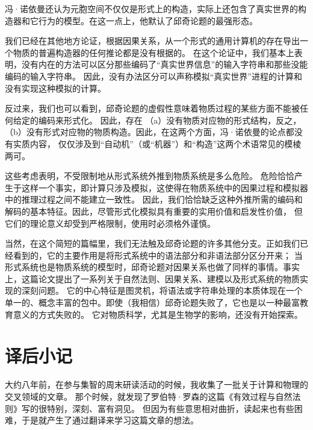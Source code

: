 \documentclass[a4paper,12pt]{article}
\begin{document}
冯·诺依曼还认为元胞空间不仅仅是形式上的构造，实际上还包含了真实世界的构造器和它行为的模型。在这一点上，他默认了邱奇论题的最强形态。

我们已经在其他地方\cite{RosenR1985}论证，根据因果关系，从一个形式的通用计算机的存在导出一个物质的普遍构造器的任何推论都是没有根据的。
在这个论证中，我们基本上表明，没有内在的方法可以区分那些编码了“真实世界信息”的输入字符串和那些没能编码的输入字符串。
因此，没有办法区分可以声称模拟“真实世界”进程的计算和没有实现这种模拟的计算。

反过来，我们也可以看到，邱奇论题的虚假性意味着物质过程的某些方面不能被任何给定的编码来形式化。
因此，存在 （a）没有物质对应物的形式结构，反之，（b）没有形式对应物的物质构造。因此，在这两个方面，冯·诺依曼的论点都没有实质内容，
仅仅涉及到“自动机”（或“机器”）和“构造”这两个术语常见的模棱两可。

这些考虑表明，不受限制地从形式系统外推到物质系统是多么危险。
危险恰恰产生于这样一个事实，即计算只涉及模拟，这使得在物质系统中的因果过程和模拟器中的推理过程之间不能建立一致性。
因此，我们恰恰缺乏这种外推所需的编码和解码的基本特征。因此，尽管形式化模拟具有重要的实用价值和启发性价值，
但它们的理论意义却受到严格限制，使用时必须格外谨慎。

当然，在这个简短的篇幅里，我们无法触及邱奇论题的许多其他分支。正如我们已经看到的，它的主要作用是将形式系统中的语法部分和非语法部分区分开来；
当形式系统也是物质系统的模型时，邱奇论题对因果关系也做了同样的事情。事实上，这篇论文提出了一系列关于自然法则、因果关系、建模以及形式系统的物质实现的深刻问题。
它的中心特征是图灵机，将语法或字符串处理的本质体现在一个单一的、概念丰富的包中。即使（我相信）邱奇论题失败了，它也是以一种最富教育意义的方式失败的。
它对物质科学，尤其是生物学的影响，还没有开始探索。

\newpage
{}
{}



\newpage
{}
{}
\printindex
\printglossaries

\newpage
\appendix
\section{译后小记}

大约八年前，在参与集智的周末研读活动的时候，我收集了一批关于计算和物理的交叉领域的文章。
那个时候，就发现了罗伯特·罗森的这篇《有效过程与自然法则》写的很特别，深刻、富有洞见。
但因为有些意思相对曲折，读起来也有些困难，于是就产生了通过翻译来学习这篇文章的想法。
\end{document}
